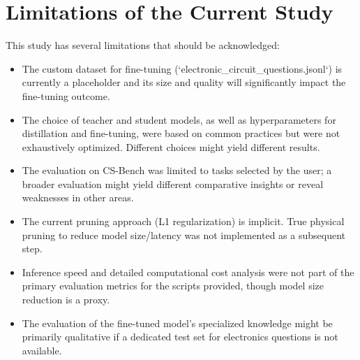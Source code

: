 \documentclass[12pt, a4paper]{report}
\begin{document}
\section{Limitations of the Current Study}
\label{sec:limitations_of_study}
This study has several limitations that should be acknowledged:
\begin{itemize}
    \item The custom dataset for fine-tuning (`electronic_circuit_questions.jsonl`) is currently a placeholder and its size and quality will significantly impact the fine-tuning outcome. %
    \item The choice of teacher and student models, as well as hyperparameters for distillation and fine-tuning, were based on common practices but were not exhaustively optimized. Different choices might yield different results.
    \item The evaluation on CS-Bench was limited to tasks selected by the user; a broader evaluation might yield different comparative insights or reveal weaknesses in other areas.
    \item The current pruning approach (L1 regularization) is implicit. True physical pruning to reduce model size/latency was not implemented as a subsequent step.
    \item Inference speed and detailed computational cost analysis were not part of the primary evaluation metrics for the scripts provided, though model size reduction is a proxy.
    \item The evaluation of the fine-tuned model's specialized knowledge might be primarily qualitative if a dedicated test set for electronics questions is not available.
\end{itemize}
\end{document}
